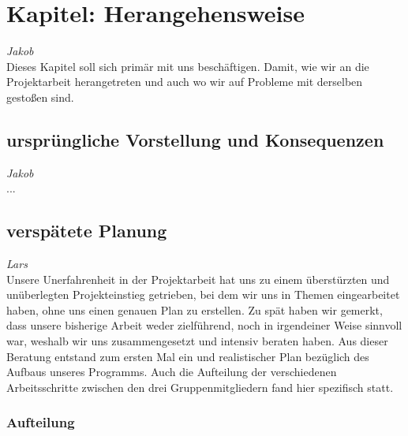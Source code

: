 \documentclass[12pt,a4paper,bibliography=totocnumbered,listof=totocnumbered]{scrartcl}
\begin{document}
\onehalfspacing
\renewcommand{\thesection}{\arabic{section}}
\renewcommand{\theHsection}{\arabic{section}}
\setcounter{section}{0}
\setcounter{page}{1}

\section{Kapitel: Herangehensweise}
\emph{Jakob}\\
Dieses Kapitel soll sich primär mit uns beschäftigen.
Damit, wie wir an die Projektarbeit herangetreten und auch wo wir auf Probleme mit derselben gestoßen sind.

\subsection{ursprüngliche Vorstellung und Konsequenzen}
\emph{Jakob}\\
...

\subsection{verspätete Planung}
\emph{Lars}\\
Unsere Unerfahrenheit in der Projektarbeit hat uns zu einem überstürzten und unüberlegten Projekteinstieg getrieben, bei dem wir uns in Themen eingearbeitet haben, ohne uns einen genauen Plan zu erstellen. Zu spät haben wir gemerkt, dass unsere bisherige Arbeit weder zielführend, noch in irgendeiner Weise sinnvoll war, weshalb wir uns zusammengesetzt und intensiv beraten haben. Aus dieser Beratung entstand zum ersten Mal ein und realistischer Plan bezüglich des Aufbaus unseres Programms. Auch die Aufteilung der verschiedenen Arbeitsschritte zwischen den  drei Gruppenmitgliedern fand hier spezifisch statt.

\subsubsection{Aufteilung}
\label{sec:Aufteilung}
\end{document}

